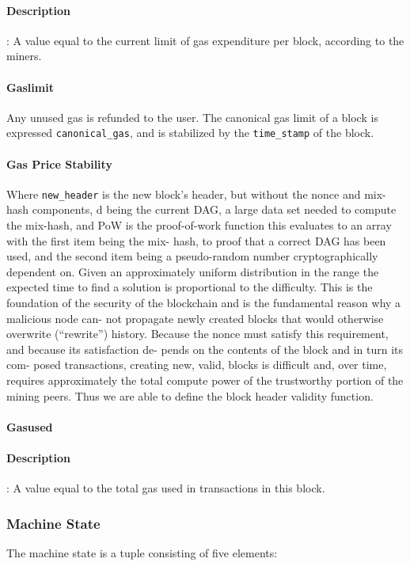 \documentclass[10pt,a4paper,leqno,bibliography=totoc]{scrartcl}
\newenvironment{alphafootnotes}
{\par\edef\savedfootnotenumber{\number\value{footnote}}
\renewcommand{\thefootnote}{\alph{footnote}}
\setcounter{footnote}{0}}
{\par\setcounter{footnote}{\savedfootnotenumber}}
\begin{document}
\begin{alphafootnotes}
\begin{multicols*}{2}
					\paragraph{Description}: A value equal to the current limit of gas expenditure per block, according to the miners. 
				\paragraph{Gaslimit}
					Any unused gas is refunded to the user. The canonical gas limit of a block is expressed \texttt{canonical\_gas}, and is stabilized by the \texttt{time\_stamp} of the block.
					
				\paragraph{Gas Price Stability}
					Where \texttt{new\_header} is the new block’s header, but without the nonce and mix-hash components, d being the current DAG, a large data set needed to compute the mix-hash, and PoW is the proof-of-work function this evaluates to an array with the first item being the mix- hash, to proof that a correct DAG has been used, and the second item being a pseudo-random number cryptographically dependent on. Given an approximately uniform distribution in the range the expected time to find a solution is proportional to the difficulty. This is the foundation of the security of the blockchain and is the fundamental reason why a malicious node can- not propagate newly created blocks that would otherwise overwrite (“rewrite”) history. Because the nonce must satisfy this requirement, and because its satisfaction de- pends on the contents of the block and in turn its com- posed transactions, creating new, valid, blocks is difficult and, over time, requires approximately the total compute power of the trustworthy portion of the mining peers. Thus we are able to define the block header validity function.
				\paragraph{Gasused}
		\paragraph{Description}: A value equal to the total gas used in transactions in this block. 

			\subsubsection{Machine State}
			The machine state is a tuple consisting of five elements:
		

\end{multicols*}
\end{alphafootnotes}
\end{document}
